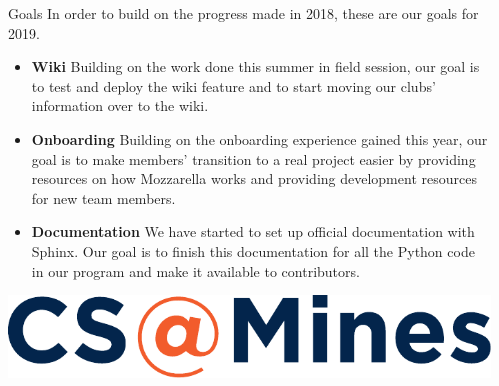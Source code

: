 \documentclass[final]{beamer}
\newlength{\sepwid}
\newlength{\onecolwid}
\begin{document}
\begin{frame}[t]
\begin{columns}[t]
            \begin{column}{\sepwid}\end{column} %

            \begin{column}{\onecolwid} %

                \begin{block}{Goals}
                    \setlength{\parskip}{0.5em}
		    In order to build on the progress made in 2018, these are
		    our goals for 2019.
                    \begin{itemize}

                        \item \textbf{Wiki} Building on the work done this
			    summer in field session, our goal is to test and
			    deploy the wiki feature and to start moving our
			    clubs' information over to the wiki.

                        \item \textbf{Onboarding} Building on the onboarding
			    experience gained this year, our goal is to make
			    members' transition to a real project easier by
			    providing resources on how Mozzarella works and
			    providing development resources for new team
			    members.

                        \item \textbf{Documentation} We have started to set up
			    official documentation with Sphinx. Our goal is to
			    finish this documentation for all the Python code in
			    our program and make it available to contributors.

                    \end{itemize}

                \end{block}
		\includegraphics[width=.95\linewidth]{csam.pdf}

            \end{column} %

        \end{columns} %

    \end{frame} %
\end{document}
